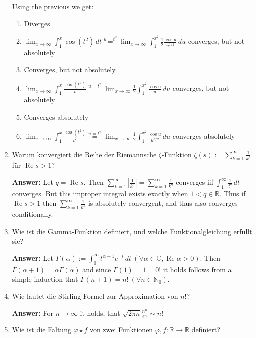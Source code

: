 \documentclass[11pt]{article}
\newcommand{\abs}[1]{\left|#1\right|}
\newcommand{\RR}[0]{\mathbb{R}}
\newcommand{\CC}[0]{\mathbb{C}}
\newcommand{\NN}[0]{\mathbb{N}}
\renewcommand{\Re}[0]{\operatorname{Re}}
\begin{document}
\begin{enumerate}
    Using the previous we get:
    \begin{enumerate}
        \item Diverges
        \item $\lim_{x\to\infty} \int_1^x \cos{(t^2)}\,dt \stackrel{u = t^2}{=} \lim_{x\to\infty} \int_1^{x^2}\frac{1}{2}\frac{\cos{u} }{u^{1/2}} \,du$ converges, but not absolutely
        \item Converges, but not absolutely
        \item $\lim_{x\to\infty} \int_1^x \frac{\cos{(t^2)}}{t} \stackrel{u = t^2}{=}\lim_{x\to\infty}  \frac{1}{2}\int_1^{x^2} \frac{\cos{u}}{u}\,du$ converges, but not absolutely
        \item Converges absolutely
        \item $\lim_{x\to\infty} \int_1^x \frac{\cos{(t^2)}}{t^2} \stackrel{u = t^2}{=}\lim_{x\to\infty}  \frac{1}{2}\int_1^{x^2} \frac{\cos{u}}{u^{3/2}}\,du$ converges absolutely
    \end{enumerate}
    \item Warum konvergiert die Reihe der Riemannsche $\zeta$-Funktion $\zeta(s) := \sum_{k=1}^\infty \frac{1}{k^s}$ für $\Re{s} > 1$?

    \textbf{Answer:} Let $q = \Re{s}$. Then $\sum_{k=1}^\infty \abs{\frac{1}{k^s}} = \sum_{k=1}^\infty \frac{1}{k^q}$ converges iif $\int_1^\infty \frac{1}{t^q}\,dt$ converges. But this improper integral exists exactly when $1 < q \in \RR$. Thus if $\Re{s} > 1$ then $\sum_{k=1}^\infty \frac{1}{k^s}$ is absolutely convergent, and thus also converges conditionally.

    \item Wie ist die Gamma-Funktion definiert, und welche Funktionalgleichung erfüllt sie?

    \textbf{Answer:} Let $\Gamma(\alpha) := \int_0^\infty t^{\alpha -1} e^{-t}\,dt~(\forall \alpha \in \CC, \Re\alpha > 0)$. Then $\Gamma(\alpha + 1) = \alpha \Gamma(\alpha)$ and since $\Gamma(1) = 1 = 0!$ it holds follows from a simple induction that $\Gamma(n+1) = n!~(\forall n \in \NN_0)$.

    \item Wie lautet die Stirling-Formel zur Approximation von $n!$?

    \textbf{Answer:} For $n \to \infty$ it holds, that $\sqrt{2\pi n} \frac{n^n}{e^n}
    \sim n!$
    \item Wie ist die Faltung $\varphi \star f$ von zwei Funktionen $\varphi, f: \RR \to \RR$ definiert?


\end{enumerate}
\end{document}

